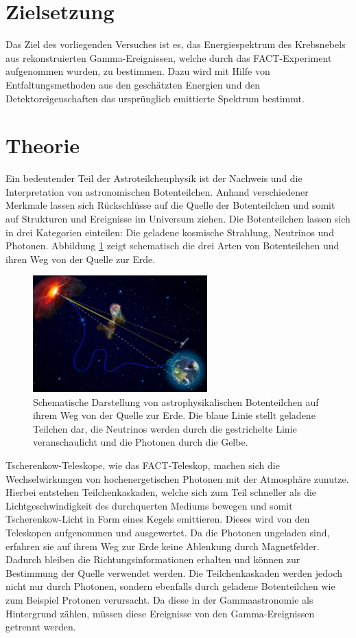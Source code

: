 \section{Zielsetzung}
Das Ziel des vorliegenden Versuches ist es, das Energiespektrum des Krebsnebels aus rekonstruierten Gamma-Ereignissen, welche durch das FACT-Experiment aufgenommen wurden, zu bestimmen. Dazu wird mit Hilfe von Entfaltungsmethoden aus den geschätzten Energien und den Detektoreigenschaften das ursprünglich emittierte Spektrum bestimmt.

\section{Theorie}
Ein bedeutender Teil der Astroteilchenphysik ist der Nachweis und die Interpretation von astronomischen Botenteilchen. Anhand verschiedener Merkmale lassen sich Rückschlüsse auf die Quelle der Botenteilchen und somit auf Strukturen und Ereignisse im Universum ziehen. Die Botenteilchen lassen sich in drei Kategorien einteilen: Die geladene kosmische Strahlung, Neutrinos und Photonen. 
Abbildung \ref{fig:Boten} zeigt schematisch die drei Arten von Botenteilchen und ihren Weg von der Quelle zur Erde.
\begin{figure}
  \centering
  \includegraphics[width=0.6\textwidth]{graphics/Folie5.png}
  \caption{Schematische Darstellung von astrophysikalischen Botenteilchen auf ihrem Weg von der Quelle zur Erde. Die blaue Linie stellt geladene Teilchen dar, die Neutrinos werden durch die gestrichelte Linie veranschaulicht und die Photonen durch die Gelbe.\cite{anleitung}}
  \label{fig:Boten}
\end{figure}
\FloatBarrier
Tscherenkow-Teleskope, wie das FACT-Teleskop, machen sich die Wechselwirkungen von hochenergetischen Photonen mit der Atmosphäre zunutze. Hierbei entstehen Teilchenkaskaden, welche sich zum Teil schneller als die Lichtgeschwindigkeit des durchquerten Mediums bewegen und somit Tscherenkow-Licht in Form eines Kegels emittieren. Dieses wird von den Teleskopen aufgenommen und ausgewertet.
Da die Photonen ungeladen sind, erfahren sie auf ihrem Weg zur Erde keine Ablenkung durch Magnetfelder. Dadurch bleiben die Richtungsinformationen erhalten und können zur Bestimmung der Quelle verwendet werden.
Die Teilchenkaskaden werden jedoch nicht nur durch Photonen, sondern ebenfalls durch geladene Botenteilchen wie zum Beispiel Protonen verursacht. Da diese in der Gammaastronomie als Hintergrund zählen, müssen diese Ereignisse von den Gamma-Ereignissen getrennt werden.



